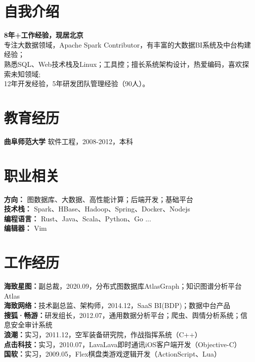 \documentclass[UTF8,margin,line]{res}
\begin{document}

\begin{resume}

\section{\sc 自我介绍}
\textbf{8年+工作经验，现居北京} \\
专注大数据领域，Apache Spark Contributor，有丰富的大数据BI系统及中台构建经验； \\
熟悉SQL、Web技术栈及Linux；工具控；擅长系统架构设计，热爱编码，喜欢探索未知领域; \\
12年开发经验，5年研发团队管理经验（90人）。

\section{\sc 教育经历}
\textbf{曲阜师范大学} 软件工程，2008-2012，本科

\section{\sc 职业相关}
\textbf{方向：} 图数据库、大数据、高性能计算；后端开发；基础平台 \\
\textbf{技术栈：} Spark、HBase、Hadoop、Spring、Docker、Nodejs \\
\textbf{编程语言：} Rust、Java、Scala、Python、Go ... \\
\textbf{编辑器：} Vim

\section{\sc 工作经历}
\textbf{海致星图：}副总裁，2020.09，分布式图数据库AtlasGraph；知识图谱分析平台Atlas \\
\textbf{海致网络：}技术副总监、架构师，2014.12，SaaS BI(BDP)；数据中台产品 \\
\textbf{搜狐·畅游：}研发组长，2012.07，通用数据分析平台；爬虫、舆情分析系统；信息安全审计系统 \\
\textbf{浪潮：}实习，2011.12，空军装备研究院，作战指挥系统（C++） \\
\textbf{点击科技：}实习，2010.07，LavaLava即时通讯iOS客户端开发（Objective-C） \\
\textbf{国软：}实习，2009.05，Flex棋盘类游戏逻辑开发（ActionScript、Lua） \\


\end{resume}
\end{document}
